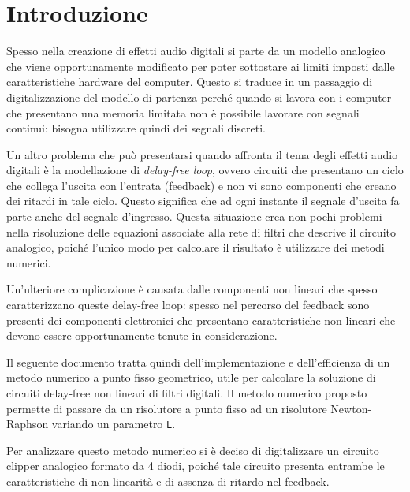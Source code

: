 \documentclass[12pt,a4paper,twoside,english,italian]{book}
\begin{document}
	\pagestyle{fancy} 
	\frontmatter
	\maketitle	

	\enlargethispage{-1.5\baselineskip}
	\tableofcontents
	
	\chapter*{Introduzione}
		Spesso nella creazione di effetti audio digitali si parte da un modello analogico che viene opportunamente modificato per poter sottostare ai limiti imposti dalle caratteristiche hardware del computer. Questo si traduce in un passaggio di digitalizzazione del modello di partenza perché quando si lavora con i computer che presentano una memoria limitata non è possibile lavorare con segnali continui: bisogna utilizzare quindi dei segnali discreti.
		
		Un altro problema che può presentarsi quando affronta il tema degli effetti audio digitali è la modellazione di \textit{delay-free loop}, ovvero circuiti che presentano un ciclo che collega l'uscita con l'entrata (feedback) e non vi sono componenti che creano dei ritardi in tale ciclo. Questo significa che ad ogni instante il segnale d'uscita fa parte anche del segnale d'ingresso. Questa situazione crea non pochi problemi nella risoluzione delle equazioni associate alla rete di filtri che descrive il circuito analogico, poiché l'unico modo per calcolare il risultato è utilizzare dei metodi numerici.
		
		Un'ulteriore complicazione è causata dalle componenti non lineari che spesso caratterizzano queste delay-free loop: spesso nel percorso del feedback sono presenti dei componenti elettronici che presentano caratteristiche non lineari che devono essere opportunamente tenute in considerazione.
			
		Il seguente documento tratta quindi dell'implementazione e dell'efficienza di un metodo numerico a punto fisso geometrico, utile per calcolare la soluzione di circuiti delay-free non lineari di filtri digitali. Il metodo numerico proposto permette di passare da un risolutore a punto fisso ad un risolutore Newton-Raphson variando un parametro \texttt{L}.
		
		Per analizzare questo metodo numerico si è deciso di digitalizzare un circuito clipper analogico formato da 4 diodi, poiché tale circuito presenta entrambe le caratteristiche di non linearità e di assenza di ritardo nel feedback.
		
\end{document}
